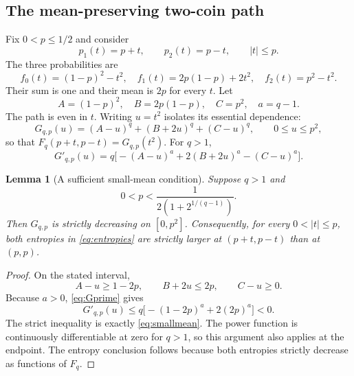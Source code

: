 \documentclass[11pt]{article}
\numberwithin{equation}{section}
\newtheorem{lemma}[theorem]{Lemma}
\theoremstyle{definition}
\theoremstyle{remark}
\begin{document}
\subsection{The mean-preserving two-coin path}
Fix $0<p\leq1/2$ and consider
\begin{equation}
 p_1(t)=p+t,\qquad p_2(t)=p-t,\qquad |t|\leq p.
 \label{eq:path}
\end{equation}
The three probabilities are
\begin{equation}
 f_0(t)=(1-p)^2-t^2,\quad
 f_1(t)=2p(1-p)+2t^2,\quad
 f_2(t)=p^2-t^2.\label{eq:threeprob}
\end{equation}
Their sum is one and their mean is $2p$ for every $t$. Let
\begin{equation}
 A=(1-p)^2,\quad B=2p(1-p),\quad C=p^2,\quad a=q-1.
\end{equation}
The path is even in $t$. Writing $u=t^2$ isolates its essential dependence:
\begin{equation}
 G_{q,p}(u)=(A-u)^q+(B+2u)^q+(C-u)^q,
 \qquad 0\leq u\leq p^2,\label{eq:G}
\end{equation}
so that $F_q(p+t,p-t)=G_{q,p}(t^2)$.
For $q>1$,
\begin{equation}
 G'_{q,p}(u)=q\bigl[-(A-u)^a+2(B+2u)^a-(C-u)^a\bigr].
 \label{eq:Gprime}
\end{equation}

\begin{lemma}[A sufficient small-mean condition]\label{lem:smallmean}
Suppose $q>1$ and
\begin{equation}
 0<p<\frac{1}{2(1+2^{1/(q-1)})}.\label{eq:smallmean}
\end{equation}
Then $G_{q,p}$ is strictly decreasing on $[0,p^2]$. Consequently, for every
$0<|t|\leq p$, both entropies in \eqref{eq:entropies} are strictly larger at
$(p+t,p-t)$ than at $(p,p)$.
\end{lemma}
\begin{proof}
On the stated interval,
\[
 A-u\geq1-2p,\qquad B+2u\leq2p,\qquad C-u\geq0.
\]
Because $a>0$, \eqref{eq:Gprime} gives
\[
 G'_{q,p}(u)\leq q\bigl[-(1-2p)^a+2(2p)^a\bigr]<0.
\]
The strict inequality is exactly \eqref{eq:smallmean}. The power function is
continuously differentiable at zero for $q>1$, so this argument also applies
at the endpoint. The entropy conclusion follows because both entropies
strictly decrease as functions of $F_q$.
\end{proof}
\end{document}
